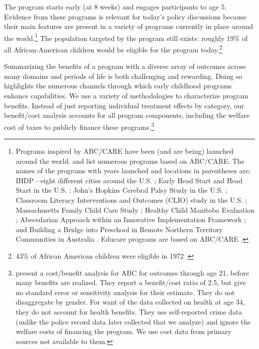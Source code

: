 The program starts early (at 8 weeks) and engages participants to age 5. Evidence from these programs is relevant for today's policy discussions because their main features are present in a variety of programs currently in place around the world.\footnote{Programs inspired by ABC/CARE have been (and are being) launched around the world. \citet{Sparling_2010_Highlights} and \citet{Ramey_Ramey_Lanzi_2014_Interventions} list numerous programs based on ABC/CARE. The names of the programs with years launched and locations in parentheses are: IHDP---eight different cities around the U.S. \citep{Spiker-etal_1997_Helping}; Early Head Start and Head Start in the U.S. \citep{Schneider_McDonald-eds_2007_Scale-Up_Vol-1}; John's Hopkins Cerebral Palsy Study in the U.S. \citep{Sparling_2010_Highlights}; Classroom Literacy Interventions and Outcomes (CLIO) study in the U.S. \citep{Sparling_2010_Highlights}; Massachusetts Family Child Care Study \citep{Collins_etal_2010_Massachusetts-Study}; Healthy Child Manitoba Evaluation \citep{Healthy_Child_Manitoba_2015_Starting-Early}; Abecedarian Approach within an Innovative Implementation Framework \citep{Jensen_Nielsen_2016_ABC-Programme-Pilot}; and Building a Bridge into Preschool in Remote Northern Territory Communities in Australia \citep{UMonash_Dataset_2015_URL}. Educare programs are based on ABC/CARE \citep{Educare_2014_Research_Agenda,Yazejian_Bryant_2012_Educare}.} The population targeted by the program still exists: roughly 19\% of all African-American children would be eligible for the program today.\footnote{43\% of African American children were eligible in 1972 \citep{Garcia_2016_National-Implementation-ECI}.}

Summarizing the benefits of a program with a diverse array of outcomes across many domains and periods of life is both challenging and rewarding. Doing so highlights the numerous channels through which early childhood programs enhance capabilities. We use a variety of methodologies to characterize program benefits. Instead of just reporting individual treatment effects by category, our benefit/cost analysis accounts for all program components, including the welfare cost of taxes to publicly finance these programs.\footnote{\cite{Barnett_Masse_2002_benefitcost,Barnett_Masse_2007_EER} present a cost/benefit analysis for ABC for outcomes through age 21, before many benefits are realized. They report a benefit/cost ratio of 2.5, but give no standard error or sensitivity analysis for their estimate. They do not disaggregate by gender. For want of the data collected on health at age 34, they do not account for health benefits. They use self-reported crime data (unlike the police record data later collected that we analyze) and ignore the welfare costs of financing the program. We use cost data from primary sources not available to them.}


